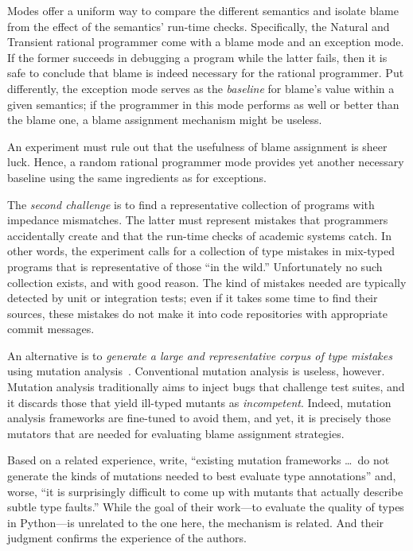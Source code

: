 Modes offer a uniform way to compare the different semantics and  isolate
blame from the effect of the semantics' run-time checks. Specifically, the Natural and
Transient rational programmer come with a blame mode and an exception
mode. If the former succeeds in debugging a program while the latter
fails, then it is safe to conclude that blame is indeed necessary for the
rational programmer. Put differently, the exception mode serves as the
{\em baseline\/} for blame's value within a given semantics; if the
programmer in this mode performs as well or better than the  blame one, a blame assignment
mechanism might be useless.

An experiment must rule out that the usefulness of blame assignment is sheer
luck.  Hence, a random rational programmer mode provides yet another necessary
baseline using the same ingredients as for exceptions.

The {\em second challenge\/} is to find a representative collection of
programs with impedance mismatches. The latter must represent mistakes that programmers
accidentally create and that the run-time checks of academic systems catch. In
other words, the experiment calls for a collection of type mistakes in
mix-typed programs that is representative of those ``in the wild.''
Unfortunately no such collection exists, and with good reason. The kind of
mistakes needed are typically detected by unit or integration tests; even if it
takes some time to find their sources, these mistakes do not make it into code
repositories with appropriate commit messages.

An alternative is to {\em generate a large and representative corpus of type
mistakes \/} using mutation analysis~\citep{lipton1971fault, demillo1978hints,
jia2011analysis}. Conventional mutation analysis is useless, however.  Mutation
analysis traditionally aims to inject bugs that challenge test suites, and it
discards those that yield ill-typed mutants as \emph{incompetent}. Indeed,
mutation analysis frameworks are fine-tuned to avoid them, and yet, it is
precisely those mutators that are needed for evaluating blame assignment strategies.

Based on a related experience, \citet{gw-mutation} write,
``existing mutation frameworks \ldots\ do not generate the kinds of mutations
needed to best evaluate type annotations'' and, worse, ``it is surprisingly
difficult to come up with mutants that actually describe subtle type faults.''
While the goal of their work---to evaluate the quality of types in
Python---is unrelated to the one here, the mechanism is related. And their
judgment confirms the experience of the authors. 

